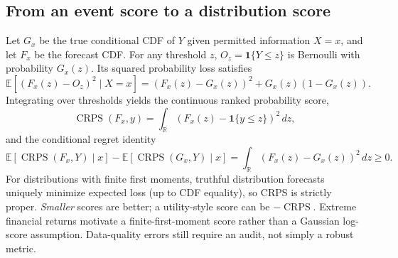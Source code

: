 \documentclass[11pt,letterpaper]{article}
\newcommand{\E}{\mathbb{E}}
\newcommand{\R}{\mathbb{R}}
\newcommand{\CRPS}{\operatorname{CRPS}}
\begin{document}
\subsection{From an event score to a distribution score}
Let $G_x$ be the true conditional CDF of $Y$ given permitted information $X=x$, and let $F_x$ be the forecast CDF. For any threshold $z$, $O_z=\mathbf{1}\{Y\le z\}$ is Bernoulli with probability $G_x(z)$. Its squared probability loss satisfies
\begin{equation}
\E[(F_x(z)-O_z)^2\mid X=x]
=(F_x(z)-G_x(z))^2+G_x(z)(1-G_x(z)).
\end{equation}
Integrating over thresholds yields the continuous ranked probability score,
\begin{equation}
\CRPS(F_x,y)=\int_{\R}(F_x(z)-\mathbf{1}\{y\le z\})^2\,dz,
\end{equation}
and the conditional regret identity
\begin{equation}
\E[\CRPS(F_x,Y)\mid x]-\E[\CRPS(G_x,Y)\mid x]
=\int_{\R}(F_x(z)-G_x(z))^2\,dz\ge0.
\label{eq:proper}
\end{equation}
For distributions with finite first moments, truthful distribution forecasts uniquely minimize expected loss (up to CDF equality), so CRPS is strictly proper. \emph{Smaller} scores are better; a utility-style score can be $-\CRPS$. Extreme financial returns motivate a finite-first-moment score rather than a Gaussian log-score assumption. Data-quality errors still require an audit, not simply a robust metric.
\end{document}
